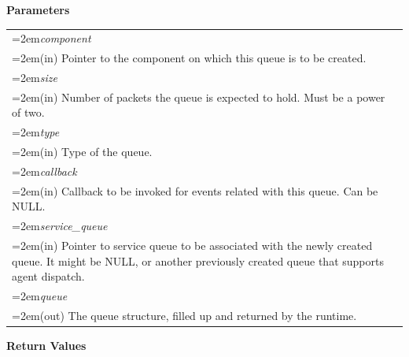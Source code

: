 \documentclass[final]{book}
\newcommand{\hsaarg}[1]{\textit{#1}}
\begin{document}
\noindent\textbf{Parameters}\\[-6mm]
\noindent\begin{longtable}{@{}>{\hangindent=2em}p{\textwidth}}
\hsaarg{component}\\\hspace{2em}(in) Pointer to the component on which this queue is to be created.\\[2mm]
\hsaarg{size}\\\hspace{2em}(in) Number of packets the queue is expected to hold. Must be a power of two.\\[2mm]
\hsaarg{type}\\\hspace{2em}(in) Type of the queue.\\[2mm]
\hsaarg{callback}\\\hspace{2em}(in) Callback to be invoked for events related with this queue. Can be NULL.\\[2mm]
\hsaarg{service_\-queue}\\\hspace{2em}(in) Pointer to service queue to be associated with the newly created queue. It might be NULL, or another previously created queue that supports agent dispatch.\\[2mm]
\hsaarg{queue}\\\hspace{2em}(out) The queue structure, filled up and returned by the runtime.
\end{longtable}
\vspace{-5mm}\noindent\textbf{Return Values}\\[-6mm]
\end{document}
